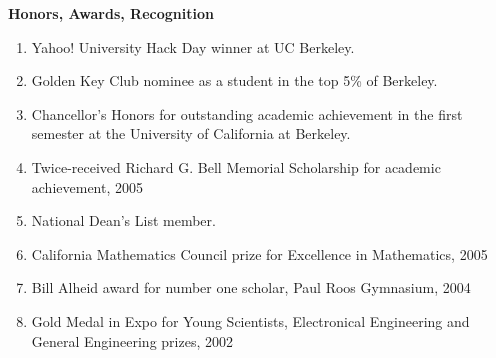 \documentclass[12pt,twoside]{article}
\newcommand\liststyleWWviiiNumiv{%
\renewcommand\labelitemi{[F0A7?]}
\renewcommand\labelitemii{o}
\renewcommand\labelitemiii{[F0A7?]}
\renewcommand\labelitemiv{[F0B7?]}
}
\begin{document}
\bigskip

{\sffamily\bfseries
Honors, Awards, Recognition}

\liststyleWWviiiNumiv
\begin{enumerate}
\item {\sffamily
Yahoo! University Hack Day winner at UC Berkeley.}
\item {\sffamily
Golden Key Club nominee as a student in the top 5\% of Berkeley.}
\item {\sffamily
Chancellor's Honors for outstanding academic achievement in the first
semester at the University of California at Berkeley.}
\item {\sffamily
Twice{}-received Richard G. Bell Memorial Scholarship for academic
achievement, 2005}
\item {\sffamily
National Dean's List member.}
\item {\sffamily
California Mathematics Council prize for Excellence in Mathematics,
2005}
\item {\sffamily
Bill Alheid award for number one scholar, Paul Roos Gymnasium, 2004}
\item {\sffamily
Gold Medal in Expo for Young Scientists, Electronical Engineering and
General Engineering prizes, 2002}
\end{enumerate}
\end{document}
